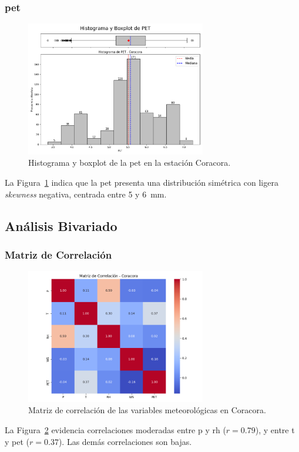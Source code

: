 \subsubsection*{\gls{pet} }
\begin{figure}[htbp]
\centering
\includegraphics[width=0.7\textwidth]{resultados/por_estacion_meteorologica/Coracora/PET_histograma.png}
\caption{Histograma y boxplot de la \gls{pet}  en la estación Coracora.}
\label{fig:coracora_PET}
\end{figure}
La Figura~\ref{fig:coracora_PET} indica que la \gls{pet} presenta una distribución simétrica con ligera \textit{skewness} negativa, centrada entre 5 y 6~mm.

\subsection{Análisis Bivariado}

\subsubsection*{Matriz de Correlación}
\begin{figure}[htbp]
\centering
\includegraphics[width=0.7\textwidth]{resultados/por_estacion_meteorologica/Coracora/matriz_correlacion.png}
\caption{Matriz de correlación de las variables meteorológicas en Coracora.}
\label{fig:coracora_corr}
\end{figure}
La Figura~\ref{fig:coracora_corr} evidencia correlaciones moderadas entre \gls{p} y \gls{rh} (\(r = 0.79\)), y entre \gls{t} y \gls{pet} (\(r = 0.37\)). Las demás correlaciones son bajas.


